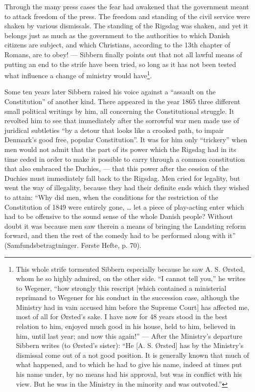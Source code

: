 \documentclass[12pt,a4paper,openany]{book}
\newcommand{\opage}[1]{\marginnote{\footnotesize\textit{[#1]}}}
\begin{document}
Through the many press cases the fear had awakened that the government
meant to attack freedom of the press. The freedom and standing of the civil service
were shaken by various dismissals. The standing of the Rigsdag was
shaken, and yet it belongs just as much
as the government to the authorities to which Danish citizens are
subject, and which Christians, according to the 13th
chapter of Romans, are to obey! --- Sibbern finally points out
that not all lawful means of putting an end to the strife
have been tried, so long as it has not been tested what influence
a change of ministry would have\footnote{This whole strife tormented Sibbern especially because he saw A. S. Ørsted,
whom he so highly admired, on the other side. ``I cannot
tell you,'' he writes to Wegener, ``how strongly this rescript
[which contained a ministerial reprimand to Wegener for his
conduct in the succession case, although the Ministry had in vain
accused him before the Supreme Court] has affected me, most of all for Ørsted's
sake. I have now for 48 years stood in the best relation to him,
enjoyed much good in his house, held to him, believed in him, until
last year; and now this again!'' --- After the Ministry's departure Sibbern writes
(to Ørsted's sister): ``He [A. S. Ørsted] has by the Ministry's
dismissal come out of a not good position. It is
generally known that much of what happened, and to which he had to give his name,
indeed at times put his name under, by no means had his approval,
but was in conflict with his view. But he was in the Ministry
in the minority and was outvoted.''}.

Some ten years later Sibbern raised his voice against a
``assault on the Constitution'' of another kind. There appeared in the year
1865 three different small political writings by him, all concerning
the Constitutional struggle. It revolted him to see that immediately
after the sorrowful war men made use of juridical
subtleties ``by a detour that looks like a crooked path, to
\opage{106}impair Denmark's good free, popular Constitution''. It was for
him only ``trickery'' when men would not admit that
the part of its power which the Rigsdag had in its time ceded
in order to make it possible to carry through a common constitution
that also embraced the Duchies, --- that this power after
the cession of the Duchies must immediately fall back to
the Rigsdag. Men cried for legality, but went the way of
illegality, because they had their definite ends which they wished to
attain: ``Why did men, when the conditions for
the restriction of the Constitution of 1849 were entirely gone, … let a
piece of play-acting enter which had to be offensive to the sound sense of
the whole Danish people? Without doubt it was because
men saw therein a means of bringing the Landsting reform forward,
and then the rest of the comedy had to be performed along with it''
(Samfundsbetragtninger. Første Hefte, p. 70).
\end{document}

